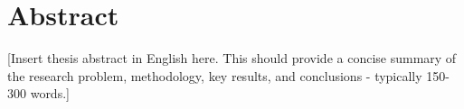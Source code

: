 \chapter*{Abstract}

[Insert thesis abstract in English here. This should provide a concise summary of the research problem, methodology, key results, and conclusions - typically 150-300 words.]
